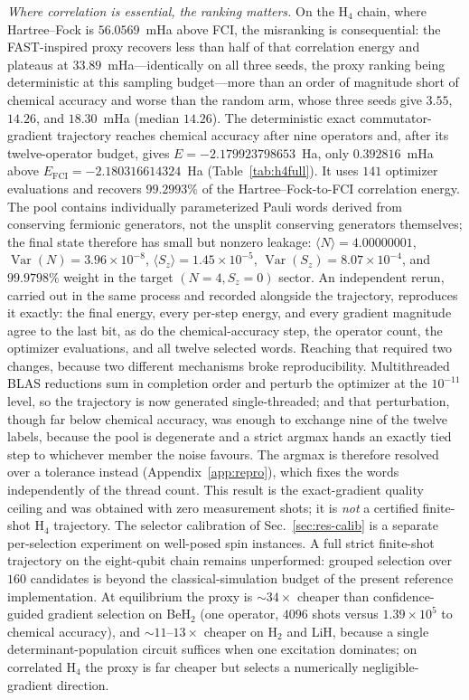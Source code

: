 \documentclass[aps,pra,reprint,superscriptaddress,nofootinbib,floatfix]{revtex4-2}
\begin{document}
\emph{Where correlation is essential, the ranking matters.} On the H$_4$ chain, where Hartree--Fock is $56.0569$~mHa above FCI, the misranking is consequential: the FAST-inspired proxy recovers less than half of that correlation energy and plateaus at $33.89$~mHa---identically on all three seeds, the proxy ranking being deterministic at this sampling budget---more than an order of magnitude short of chemical accuracy and worse than the random arm, whose three seeds give $3.55$, $14.26$, and $18.30$~mHa (median $14.26$). The deterministic exact commutator-gradient trajectory reaches chemical accuracy after nine operators and, after its twelve-operator budget, gives $E=-2.179923798653$~Ha, only $0.392816$~mHa above $E_{\mathrm{FCI}}=-2.180316614324$~Ha (Table~\ref{tab:h4full}). It uses $141$ optimizer evaluations and recovers $99.2993\%$ of the Hartree--Fock-to-FCI correlation energy. The pool contains individually parameterized Pauli words derived from conserving fermionic generators, not the unsplit conserving generators themselves; the final state therefore has small but nonzero leakage: $\langle N\rangle=4.00000001$, $\operatorname{Var}(N)=3.96\times10^{-8}$, $\langle S_z\rangle=1.45\times10^{-5}$, $\operatorname{Var}(S_z)=8.07\times10^{-4}$, and $99.9798\%$ weight in the target $(N=4,S_z=0)$ sector. An independent rerun, carried out in the same process and recorded alongside the trajectory, reproduces it exactly: the final energy, every per-step energy, and every gradient magnitude agree to the last bit, as do the chemical-accuracy step, the operator count, the optimizer evaluations, and all twelve selected words. Reaching that required two changes, because two different mechanisms broke reproducibility. Multithreaded BLAS reductions sum in completion order and perturb the optimizer at the $10^{-11}$ level, so the trajectory is now generated single-threaded; and that perturbation, though far below chemical accuracy, was enough to exchange nine of the twelve labels, because the pool is degenerate and a strict argmax hands an exactly tied step to whichever member the noise favours. The argmax is therefore resolved over a tolerance instead (Appendix~\ref{app:repro}), which fixes the words independently of the thread count. This result is the exact-gradient quality ceiling and was obtained with zero measurement shots; it is \emph{not} a certified finite-shot H$_4$ trajectory. The selector calibration of Sec.~\ref{sec:res-calib} is a separate per-selection experiment on well-posed spin instances. A full strict finite-shot trajectory on the eight-qubit chain remains unperformed: grouped selection over $160$ candidates is beyond the classical-simulation budget of the present reference implementation. At equilibrium the proxy is $\sim\!34\times$ cheaper than confidence-guided gradient selection on BeH$_2$ (one operator, $4096$ shots versus $1.39\times10^5$ to chemical accuracy), and $\sim\!11$--$13\times$ cheaper on H$_2$ and LiH, because a single determinant-population circuit suffices when one excitation dominates; on correlated H$_4$ the proxy is far cheaper but selects a numerically negligible-gradient direction.
\end{document}
